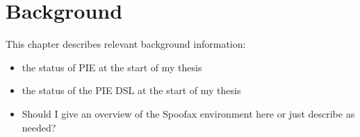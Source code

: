 \chapter{\label{chap:background}Background}

This chapter describes relevant background information:
\begin{itemize}
  \item the status of PIE at the start of my thesis
  \item the status of the PIE DSL at the start of my thesis
  \item Should I give an overview of the Spoofax environment here or just describe as needed?
\end{itemize}
